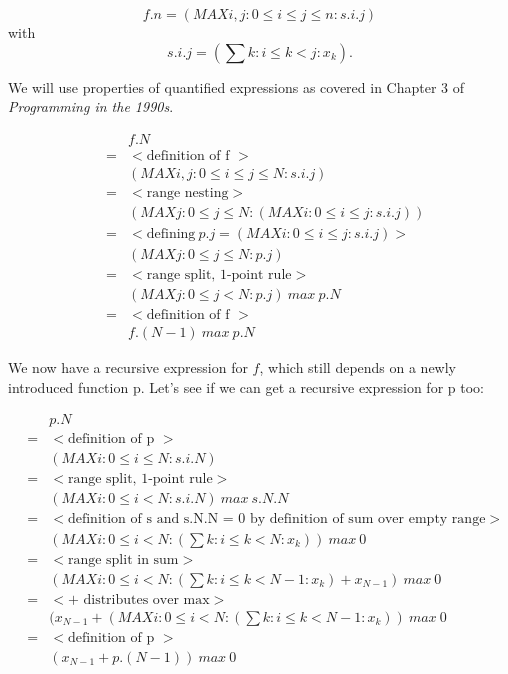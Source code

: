 \[
	f.n = (MAX i, j : 0 \leq i \leq j \leq n : s.i.j) 
\]
with 
\[	 
	s.i.j = (\sum k : i \leq k < j : x_k).
\]

We will use properties of quantified expressions as covered in Chapter 3 of \textit{Programming in the 1990s}\cite{Cohen90}.

\[
\begin{array}{lcl}
		&&f.N \\
	      &=& { < \mbox{definition of f } >} \\      
                  && (MAX i, j : 0 \leq i \leq j \leq N : s.i.j)\\
                &=& { < \mbox{range nesting} >} \\
                  && (MAX j : 0 \leq j \leq N : (MAX i:  0 \leq i \leq j : s.i.j)) \\
                &=& { < \mbox{defining}\  p.j =  (MAX i:  0 \leq i \leq j : s.i.j) >} \\ 
                   && (MAX j : 0 \leq j \leq N : p.j) \\
                &=& { < \mbox{range split, 1-point rule} >} \\
                	 && (MAX j : 0 \leq j < N : p.j) \ max \ p.N \\
	       &=& { < \mbox{definition of f } >} \\
	       	&& f.(N - 1) \ max \ p.N 	   
   \end{array}
\]

We now have a recursive expression for $f$, which still depends on a newly introduced function p. Let's see if we can get a recursive expression for p too:

\[
\begin{array}{lcl}
		&&p.N \\
		&=& { < \mbox{definition of p } >} \\
		 && (MAX i:  0 \leq i \leq N : s.i.N) \\
		 &=& { < \mbox{range split, 1-point rule} >} \\
		 && (MAX i:  0 \leq i < N : s.i.N)\ max \ s.N.N \\
		 &=& { < \mbox{definition of s and s.N.N = 0 by definition of sum over empty range} >} \\
		 && (MAX i:  0 \leq i < N : (\sum k : i \leq k < N : x_k))\ max \ 0 \\
		 &=& { < \mbox{range split in sum} >} \\
		 && (MAX i:  0 \leq i < N : (\sum k : i \leq k < N - 1 : x_k) + x_{N - 1})\ max \ 0 \\
		 &=& { < \mbox{+ distributes over max} >} \\
		 && (x_{N - 1} + (MAX i:  0 \leq i < N : (\sum k : i \leq k < N - 1 : x_k))\ max \ 0 \\
		 &=& { < \mbox{definition of p } >} \\
		 && (x_{N - 1} + p.(N - 1))\ max \ 0
   \end{array}
\]

